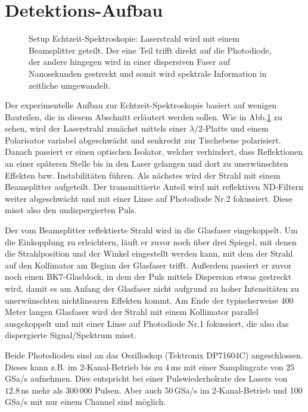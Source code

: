 \documentclass[bachelor,       %
               twoside,        %
               BCOR10mm,       %
               liststotoc,nomtotoc,bibtotoc, %
               english,ngerman, %
               final,          %
               ]{GAUBM}
\begin{document}
\section{Detektions-Aufbau}

\begin{figure}[!htb]
	\centering
	\def\svgwidth{\columnwidth}
	
	\caption{Setup Echtzeit-Spektroskopie: Laserstrahl wird mit einem Beamsplitter geteilt. Der eine Teil trifft direkt auf die Photodiode, der andere hingegen wird in einer dispersiven Faser auf Nanosekunden gestreckt und somit wird spektrale Information  in zeitliche  umgewandelt.}
	\label{fig:DFTSetup}
\end{figure}
Der experimentelle Aufbau zur Echtzeit-Spektroskopie basiert auf wenigen Bauteilen, die in diesem Abschnitt erläutert werden sollen.
Wie in Abb.\ref{fig:DFTSetup} zu sehen, wird der Laserstrahl zunächst mittels einer $\lambda/2$-Platte und einem Polarisator variabel abgeschwächt und senkrecht zur Tischebene polarisiert.
Danach passiert er einen optischen Isolator, welcher verhindert, dass Reflektionen an einer späteren Stelle bis in den Laser gelangen und dort zu unerwünschten Effekten bzw. Instabilitäten führen.
Als nächstes wird der Strahl mit einem Beamsplitter aufgeteilt.
Der transmittierte Anteil wird mit reflektiven ND-Filtern weiter abgeschwächt und mit einer Linse auf Photodiode Nr.2 fokussiert.
Diese misst also den undispergierten Puls.

Der vom Beamsplitter reflektierte Strahl wird in die Glasfaser eingekoppelt.
Um die Einkopplung zu erleichtern, läuft er zuvor noch über drei Spiegel, mit denen die Strahlposition und der Winkel eingestellt werden kann, mit dem der Strahl auf den Kollimator am Beginn der Glasfaser trifft.
Außerdem passiert er zuvor noch einen BK7-Glasblock, in dem der Puls mittels Dispersion etwas gestreckt wird, damit es am Anfang der Glasfaser nicht aufgrund zu hoher Intensitäten zu unerwünschten nichtlinearen Effekten kommt.
Am Ende der typischerweise 400 Meter langen Glasfaser wird der Strahl mit einem Kollimator parallel ausgekoppelt und mit einer Linse auf Photodiode Nr.1 fokussiert, die also das dispergierte Signal/Spektrum misst.

Beide Photodioden sind an das Oszilloskop (Tektronix DP71604C) angeschlossen.
Dieses kann z.B. im 2-Kanal-Betrieb bis zu $4\,$ms mit einer Samplingrate von $25\,$GSa/s aufnehmen.
Dies entspricht bei einer Pulswiederholrate des Lasers von $12.8\,$ns mehr als 300\,000 Pulsen.
Aber auch 50\,GSa/s im 2-Kanal-Betrieb und 100\,GSa/s mit nur einem Channel sind möglich.
\end{document}
